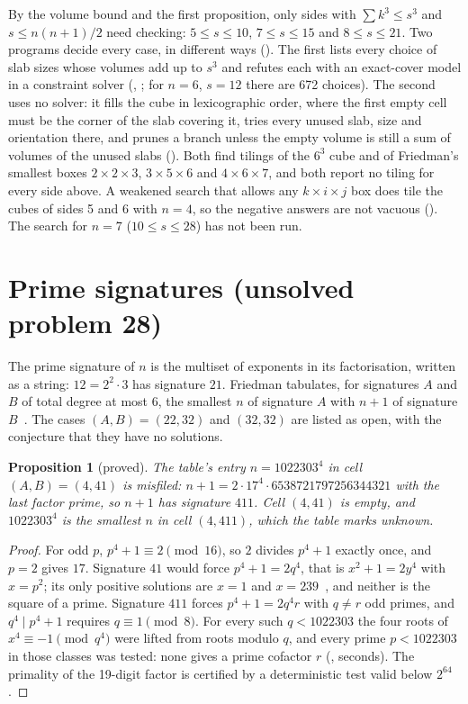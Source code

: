 \documentclass[11pt]{amsart}
\newtheorem{proposition}[theorem]{Proposition}
\theoremstyle{remark}
\begin{document}
\noindent By the volume bound and the first proposition, only sides with $\sum k^3\le s^3$ and
$s\le n(n+1)/2$ need checking: $5\le s\le10$, $7\le s\le15$ and $8\le s\le 21$. Two programs decide
every case, in different ways (). The first lists every choice of slab sizes
whose volumes add up to $s^3$ and refutes each with an exact-cover model in a constraint solver
(, ; for $n=6$, $s=12$ there are 672 choices). The second uses no
solver: it fills the cube in lexicographic order, where the first empty cell must be the corner of the
slab covering it, tries every unused slab, size and orientation there, and prunes a branch unless the
empty volume is still a sum of volumes of the unused slabs (). Both find tilings of
the $6^3$ cube and of Friedman's smallest boxes $2\times2\times3$, $3\times5\times6$ and
$4\times6\times7$, and both report no tiling for every side above. A weakened search that allows any
$k\times i\times j$ box does tile the cubes of sides 5 and 6 with $n=4$, so the negative answers are not
vacuous (). The search for $n=7$ ($10\le s\le
28$) has not been run.

\section{Prime signatures (unsolved problem 28)}\label{sec:primesig}

The prime signature of $n$ is the multiset of exponents in its factorisation, written as a string:
$12=2^2\cdot3$ has signature $21$. Friedman tabulates, for signatures $A$ and $B$ of total degree at most
6, the smallest $n$ of signature $A$ with $n+1$ of signature $B$~\cite{primesig}. The cases $(A,B)=(22,32)$
and $(32,32)$ are listed as open, with the conjecture that they have no solutions.

\begin{proposition}[proved]
The table's entry $n=1022303^4$ in cell $(A,B)=(4,41)$ is misfiled: $n+1=2\cdot17^4\cdot
6538721797256344321$ with the last factor prime, so $n+1$ has signature $411$. Cell $(4,41)$ is empty,
and $1022303^4$ is the smallest $n$ in cell $(4,411)$, which the table marks unknown.
\end{proposition}

\begin{proof}
For odd $p$, $p^4+1\equiv2\pmod{16}$, so $2$ divides $p^4+1$ exactly once, and $p=2$ gives $17$.
Signature $41$ would force $p^4+1=2q^4$, that is $x^2+1=2y^4$ with $x=p^2$; its only positive solutions
are $x=1$ and $x=239$~\cite{ljunggren}, and neither is the square of a prime. Signature $411$ forces
$p^4+1=2q^4r$ with $q\ne r$ odd primes, and $q^4\mid p^4+1$ requires $q\equiv1\pmod 8$. For every such
$q<1022303$ the four roots of $x^4\equiv-1\pmod{q^4}$ were lifted from roots modulo $q$, and every prime
$p<1022303$ in those classes was tested: none gives a prime cofactor $r$
(, seconds). The primality of the 19-digit factor is
certified by a deterministic test valid below $2^{64}$.
\end{proof}
\end{document}

